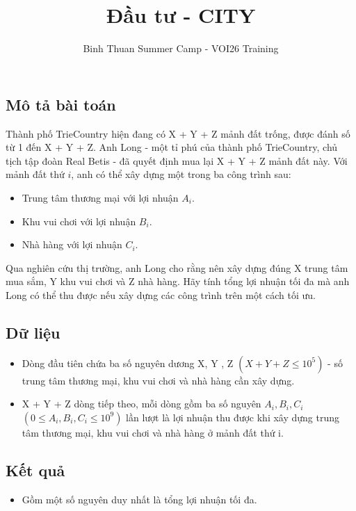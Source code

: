 \documentclass[12pt]{article}
\begin{document}
\title{Đầu tư - CITY}
\author{Binh Thuan Summer Camp - VOI26 Training}
\maketitle

\setlength{\parindent}{0pt}
\setlength{\parskip}{1em} 

\subsection*{Mô tả bài toán}
Thành phố TrieCountry hiện đang có X + Y + Z mảnh đất trống, được đánh số từ 1 đến X + Y + Z.
Anh Long - một tỉ phú của thành phố TrieCountry, chủ tịch tập đoàn Real Betis - đã quyết định mua
lại X + Y + Z mảnh đất này. Với mảnh đất thứ $i$, anh có thể xây dựng một trong ba công trình
sau:

\begin{itemize}
  \item Trung tâm thương mại với lợi nhuận $A_i$.
  \item Khu vui chơi với lợi nhuận $B_i$.
  \item Nhà hàng với lợi nhuận $C_i$.
\end{itemize}

Qua nghiên cứu thị trường, anh Long cho rằng nên xây dựng đúng X trung tâm mua sắm, Y khu
vui chơi và Z nhà hàng. Hãy tính tổng lợi nhuận tối đa mà anh Long có thể thu được nếu xây
dựng các công trình trên một cách tối ưu.

\subsection*{Dữ liệu}
\begin{itemize}
  \item Dòng đầu tiên chứa ba số nguyên dương X, Y , Z $(X + Y + Z \leq 10^5)$ - số trung tâm thương mại, khu vui chơi và nhà hàng cần xây dựng.
  \item X + Y + Z dòng tiếp theo, mỗi dòng gồm ba số nguyên $A_i, B_i, C_i$ $(0 \leq A_i, B_i, C_i \leq 10^9)$ lần 
  lượt là lợi nhuận thu được khi xây dựng trung tâm thương mại, khu vui chơi và nhà hàng ở mảnh đất thứ i.
\end{itemize}

\subsection*{Kết quả}
\begin{itemize}
  \item Gồm một số nguyên duy nhất là tổng lợi nhuận tối đa.
\end{itemize}
\end{document}

